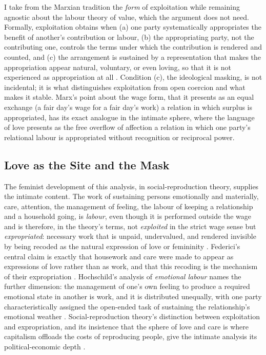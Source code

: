 \documentclass[11pt,a4paper]{article}
\begin{document}
I take from the Marxian tradition the \emph{form} of exploitation while remaining agnostic about the labour theory of value, which the argument does not need. Formally, exploitation obtains when (a) one party systematically appropriates the benefit of another's contribution or labour, (b) the appropriating party, not the contributing one, controls the terms under which the contribution is rendered and counted, and (c) the arrangement is sustained by a representation that makes the appropriation appear natural, voluntary, or even loving, so that it is not experienced as appropriation at all \parencite[on the form of appropriation and its mystification, see][esp. the analysis of the wage form]{marx1867capital}. Condition (c), the ideological masking, is not incidental; it is what distinguishes exploitation from open coercion and what makes it stable. Marx's point about the wage form, that it presents as an equal exchange (a fair day's wage for a fair day's work) a relation in which surplus is appropriated, has its exact analogue in the intimate sphere, where the language of love presents as the free overflow of affection a relation in which one party's relational labour is appropriated without recognition or reciprocal power.

\subsection{Love as the Site and the Mask}

The feminist development of this analysis, in social-reproduction theory, supplies the intimate content. The work of sustaining persons emotionally and materially, care, attention, the management of feeling, the labour of keeping a relationship and a household going, is \emph{labour}, even though it is performed outside the wage and is therefore, in the theory's terms, not \emph{exploited} in the strict wage sense but \emph{expropriated}: necessary work that is unpaid, undervalued, and rendered invisible by being recoded as the natural expression of love or femininity \parencite{federici2012revolution, fraser2016contradictions}. Federici's central claim is exactly that housework and care were made to appear as expressions of love rather than as work, and that this recoding is the mechanism of their expropriation \parencite{federici2012revolution}. Hochschild's analysis of \emph{emotional labour} names the further dimension: the management of one's own feeling to produce a required emotional state in another is work, and it is distributed unequally, with one party characteristically assigned the open-ended task of sustaining the relationship's emotional weather \parencite{hochschild1983managed}. Social-reproduction theory's distinction between exploitation and expropriation, and its insistence that the sphere of love and care is where capitalism offloads the costs of reproducing people, give the intimate analysis its political-economic depth \parencite{bhattacharya2017social}.
\end{document}
